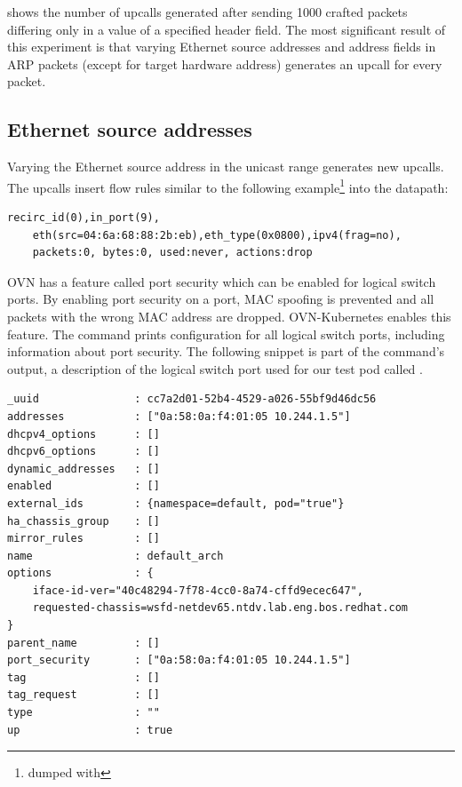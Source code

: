  shows the number of upcalls generated after sending 1000 crafted packets differing only in a value of a specified header field. The most significant result of this experiment is that varying Ethernet source addresses and address fields in ARP packets (except for target hardware address) generates an upcall for every packet.

\subsection{Ethernet source addresses}

Varying the Ethernet source address in the unicast range generates new upcalls. The upcalls insert flow rules similar to the following example\footnote{dumped with } into the datapath:

\begin{verbatim}
recirc_id(0),in_port(9),
    eth(src=04:6a:68:88:2b:eb),eth_type(0x0800),ipv4(frag=no),
    packets:0, bytes:0, used:never, actions:drop
\end{verbatim}

OVN has a feature called port security which can be enabled for logical switch ports. By enabling port security on a port, MAC spoofing is prevented and all packets with the wrong MAC address are dropped. OVN-Kubernetes enables this feature. The command  prints configuration for all logical switch ports, including information about port security. The following snippet is part of the command's output, a description of the logical switch port used for our test pod called .

\begin{verbatim}
_uuid               : cc7a2d01-52b4-4529-a026-55bf9d46dc56
addresses           : ["0a:58:0a:f4:01:05 10.244.1.5"]
dhcpv4_options      : []
dhcpv6_options      : []
dynamic_addresses   : []
enabled             : []
external_ids        : {namespace=default, pod="true"}
ha_chassis_group    : []
mirror_rules        : []
name                : default_arch
options             : {
    iface-id-ver="40c48294-7f78-4cc0-8a74-cffd9ecec647",
    requested-chassis=wsfd-netdev65.ntdv.lab.eng.bos.redhat.com
}
parent_name         : []
port_security       : ["0a:58:0a:f4:01:05 10.244.1.5"]
tag                 : []
tag_request         : []
type                : ""
up                  : true
\end{verbatim}

